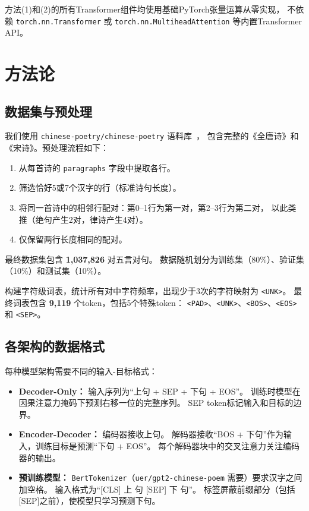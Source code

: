 \documentclass[11pt,a4paper]{article}
\begin{document}
方法(1)和(2)的所有Transformer组件均使用基础PyTorch张量运算从零实现，
不依赖 \texttt{torch.nn.Transformer} 或 \texttt{torch.nn.MultiheadAttention}
等内置Transformer API。

\section{方法论}
\label{sec:method}

\subsection{数据集与预处理}

我们使用 \texttt{chinese-poetry/chinese-poetry} 语料库~\cite{chinese-poetry}，
包含完整的《全唐诗》和《宋诗》。预处理流程如下：

\begin{enumerate}[nosep]
    \item 从每首诗的 \texttt{paragraphs} 字段中提取各行。
    \item 筛选恰好5或7个汉字的行（标准诗句长度）。
    \item 将同一首诗中的相邻行配对：第0--1行为第一对，第2--3行为第二对，
          以此类推（绝句产生2对，律诗产生4对）。
    \item 仅保留两行长度相同的配对。
\end{enumerate}

最终数据集包含 \textbf{1,037,826} 对五言对句。
数据随机划分为训练集（80\%）、验证集（10\%）和测试集（10\%）。

构建字符级词表，统计所有对中字符频率，出现少于3次的字符映射为 \texttt{<UNK>}。
最终词表包含 \textbf{9,119} 个token，包括5个特殊token：
\texttt{<PAD>}、\texttt{<UNK>}、\texttt{<BOS>}、\texttt{<EOS>} 和 \texttt{<SEP>}。

\subsection{各架构的数据格式}

每种模型架构需要不同的输入-目标格式：

\begin{itemize}[nosep]
    \item \textbf{Decoder-Only：}
          输入序列为“上句 + SEP + 下句 + EOS”。
          训练时模型在因果注意力掩码下预测右移一位的完整序列。
          SEP token标记输入和目标的边界。
    \item \textbf{Encoder-Decoder：}
          编码器接收上句。
          解码器接收“BOS + 下句”作为输入，训练目标是预测“下句 + EOS”。
          每个解码器块中的交叉注意力关注编码器的输出。
    \item \textbf{预训练模型：}
          \texttt{BertTokenizer}（\texttt{uer/gpt2-chinese-poem} 需要）要求汉字之间加空格。
          输入格式为“[CLS] 上 句 [SEP] 下 句”。
          标签屏蔽前缀部分（包括[SEP]之前），使模型只学习预测下句。
\end{itemize}
\end{document}

